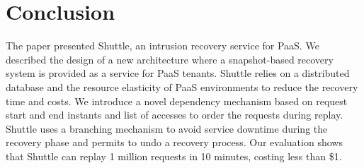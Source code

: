 
\section{Conclusion}
\label{sec:conclusion}
The paper presented Shuttle, an intrusion recovery service for PaaS. We described the design of a new architecture where a snapshot-based recovery system is provided as a service for PaaS tenants. Shuttle relies on a distributed database and the resource elasticity of PaaS environments to reduce the recovery time and costs. We introduce a novel dependency mechanism based on request start and end instants and list of accesses to order the requests during replay. 
Shuttle uses a branching mechanism to avoid service downtime during the recovery phase and permits to undo a recovery process.  
Our evaluation shows that Shuttle can replay 1 million requests in 10 minutes, costing less than \$1. 


